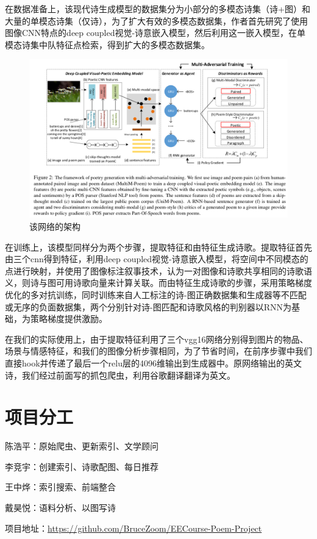 \documentclass[a4paper, 10pt]{article}
\begin{document}
在数据准备上，该现代诗生成模型的数据集分为小部分的多模态诗集（诗+图）和大量的单模态诗集（仅诗），为了扩大有效的多模态数据集，作者首先研究了使用图像CNN特点的deep coupled视觉-诗意嵌入模型，然后利用这一嵌入模型，在单模态诗集中队特征点检索，得到扩大的多模态数据集。
\begin{figure}[H]
\centering
\includegraphics[width=0.9\linewidth]{imgs/8.png}
\caption{该网络的架构}
\end{figure}

在训练上，该模型同样分为两个步骤，提取特征和由特征生成诗歌。提取特征首先由三个cnn得到特征，利用deep coupled视觉-诗意嵌入模型，将空间中不同模态的点进行映射，并使用了图像标注叙事技术，认为一对图像和诗歌共享相同的诗歌语义，则诗与图可用诗歌向量来计算关联。而由特征生成诗歌的步骤，采用策略梯度优化的多对抗训练，同时训练来自人工标注的诗-图正确数据集和生成器等不匹配或无序的负面数据集，两个分别针对诗-图匹配和诗歌风格的判别器以RNN为基础，为策略梯度提供激励。

在我们的实际使用上，由于提取特征利用了三个vgg16网络分别得到图片的物品、场景与情感特征，和我们的图像分析步骤相同，为了节省时间，在前序步骤中我们直接hook并传递了最后一个relu层的4096维输出到生成器中。原网络输出的英文诗，我们经过前面写的抓包爬虫，利用谷歌翻译翻译为英文。

\section{项目分工}
陈浩平：原始爬虫、更新索引、文学顾问

李竞宇：创建索引、诗歌配图、每日推荐

王中烨：索引搜索、前端整合

戴昊悦：语料分析、以图写诗

项目地址：\href{https://github.com/BruceZoom/EECourse-Poem-Project}{https://github.com/BruceZoom/EECourse-Poem-Project}
\end{document}
